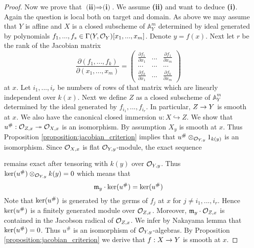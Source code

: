 \begin{proof}
Now we prove that $\textbf{(ii)}\Rightarrow \textbf{(i)}$. We assume \textbf{(ii)} and want to deduce \textbf{(i)}. Again the question is local both on target and domain.  As above we may assume that $Y$ is affine and $X$ is a closed subscheme of $\mathbb{A}^{m}_Y$ determined by ideal generated by polynomials $f_1,...,f_s\in \Gamma(Y,{\mathcal O}_Y)[x_1,...,x_{m}]$. Denote $y = f(x)$. Next let $r$ be the rank of the Jacobian matrix
$$\frac{\partial(f_1,...,f_k)}{\partial(x_1,...,x_{m})}= \left( \begin{array}{ccc}
\frac{\partial f_1}{\partial x_1} & ... & \frac{\partial f_1}{\partial x_{m}} \\
... &...  &...  \\
\frac{\partial f_k}{\partial x_{1}} &...  & \frac{\partial f_k}{\partial x_{m}}\end{array} \right)$$
at $x$. Let $i_1,...,i_r$ be numbers of rows of that matrix which are linearly independent over $k(x)$. Next we define $Z$ as a closed subscheme of $\mathbb{A}^m_Y$ determined by the ideal generated by $f_{i_1},...,f_{i_r}$. In particular, $Z\rightarrow Y$ is smooth at $x$. We also have the canonical closed immersion $u:X\hookrightarrow Z$. We show that $u^{\#}:{\mathcal O}_{Z,x} \twoheadrightarrow {\mathcal O}_{X,x} $ is an isomorphism. By assumption $X_{y}$ is smooth at $x$. Thus Proposition \ref{proposition:jacobian_criterion} implies that $u^{\#}\otimes_{{\mathcal O}_{Y,y}}1_{k(y)}$ is an isomorphism. Since ${\mathcal O}_{X,x}$ is flat ${\mathcal O}_{Y,y}$-module, the exact sequence
\begin{center}
\end{center}
remains exact after tensoring with $k(y)$ over ${\mathcal O}_{Y,y}$. Thus $\mathrm{ker}(u^{\#})\otimes_{{\mathcal O}_{Y,y}}k(y) = 0$ which means that
$$\mathfrak{m}_y\cdot \mathrm{ker}(u^{\#}) =\mathrm{ker}(u^{\#})$$
Note that $\mathrm{ker}(u^{\#})$ is generated by the germs of $f_j$ at $x$ for $j\neq i_1,...,i_r$. Hence $\mathrm{ker}(u^{\#})$ is a finitely generated module over ${\mathcal O}_{Z,x}$. Moreover, $\mathfrak{m}_y\cdot {\mathcal O}_{Z,x}$ is contained in the Jacobson radical of ${\mathcal O}_{Z,x}$. We infer by Nakayama lemma that $\mathrm{ker}(u^{\#}) = 0$. Thus $u^{\#}$ is an isomorphism of ${\mathcal O}_{Y,y}$-algebras. By Proposition \ref{proposition:jacobian_criterion} we derive that $f:X\rightarrow Y$ is smooth at $x$.
\end{proof}


\small



